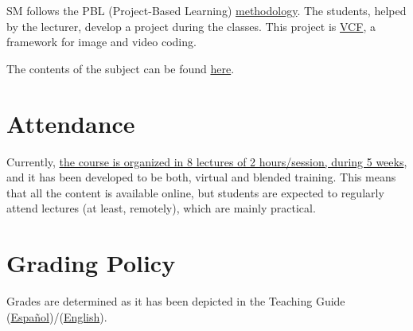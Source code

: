 SM follows the PBL (Project-Based Learning)
\href{http://portafirma.ual.es/pfirma/downloadReport/file?idDocument=4u61Ie5es2&idRequest=ZeBY35LlFa}{methodology}. The
students, helped by the lecturer, develop a project during the
classes. This project is
\href{https://github.com/Sistemas-Multimedia/VCF}{VCF}, a framework
for image and video coding.

The contents of the subject can be found \href{https://sistemas-multimedia.github.io/contents/}{here}.

\section{Attendance}

Currently,
\href{https://www.ual.es/estudios/masteres/presentacion/plandeestudios/asignatura/7114/71142105}{the
  course is organized in 8 lectures of 2 hours/session, during 5
  weeks}, and it has been developed to be both, virtual and
blended training. This means that all the content is available
online, but students are expected to regularly attend lectures (at
least, remotely), which are mainly practical.

\section{Grading Policy}

Grades are determined as it has been depicted in the Teaching Guide
(\href{https://portafirma.ual.es/pfirma/downloadReport/file?idDocument=BfF99nW06C&idRequest=miB6Ni0U5S}{Español})/(\href{https://portafirma.ual.es/pfirma/downloadReport/file?idDocument=4u61Ie5es2&idRequest=ZeBY35LlFa}{English}).
